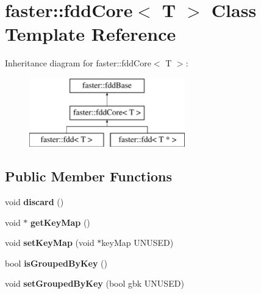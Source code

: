 \hypertarget{classfaster_1_1fddCore}{}\section{faster\+:\+:fdd\+Core$<$ T $>$ Class Template Reference}
\label{classfaster_1_1fddCore}
Inheritance diagram for faster\+:\+:fdd\+Core$<$ T $>$\+:\begin{figure}[H]
\begin{center}
\leavevmode
\includegraphics[height=3.000000cm]{classfaster_1_1fddCore}
\end{center}
\end{figure}
\subsection*{Public Member Functions}
\begin{DoxyCompactItemize}
\item 
\hypertarget{classfaster_1_1fddCore_a0addecf1c27311b6da3e37f77e414572}{}void {\bfseries discard} ()\label{classfaster_1_1fddCore_a0addecf1c27311b6da3e37f77e414572}

\item 
\hypertarget{classfaster_1_1fddCore_a7dcd1b146c23c5f5ba149a6fc2bc7741}{}void $\ast$ {\bfseries get\+Key\+Map} ()\label{classfaster_1_1fddCore_a7dcd1b146c23c5f5ba149a6fc2bc7741}

\item 
\hypertarget{classfaster_1_1fddCore_ae268b85e9f217e3942600c11b8aa3347}{}void {\bfseries set\+Key\+Map} (void $\ast$key\+Map U\+N\+U\+S\+E\+D)\label{classfaster_1_1fddCore_ae268b85e9f217e3942600c11b8aa3347}

\item 
\hypertarget{classfaster_1_1fddCore_a4ff77df4fb389f5ee6ff468f773d58f8}{}bool {\bfseries is\+Grouped\+By\+Key} ()\label{classfaster_1_1fddCore_a4ff77df4fb389f5ee6ff468f773d58f8}

\item 
\hypertarget{classfaster_1_1fddCore_a9a47c562a1f92f6c7f79968beb339c3d}{}void {\bfseries set\+Grouped\+By\+Key} (bool gbk U\+N\+U\+S\+E\+D)\label{classfaster_1_1fddCore_a9a47c562a1f92f6c7f79968beb339c3d}

\end{DoxyCompactItemize}
